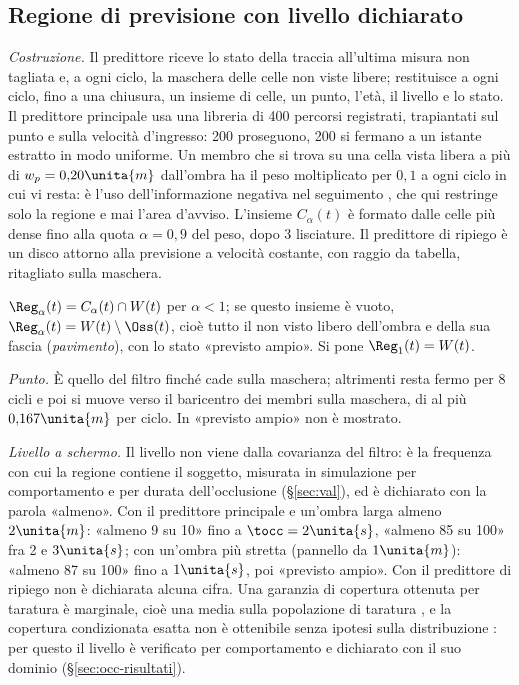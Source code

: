 \subsection{Regione di previsione con livello dichiarato}\label{sec:occ-regione}

\emph{Costruzione.} Il predittore riceve lo stato della traccia all'ultima misura non tagliata e, a ogni ciclo, la maschera delle celle non viste libere; restituisce a ogni ciclo, fino a una chiusura, un insieme di celle, un punto, l'età, il livello e lo stato. Il predittore principale usa una libreria di 400 percorsi registrati, trapiantati sul punto e sulla velocità d'ingresso: 200 proseguono, 200 si fermano a un istante estratto in modo uniforme. Un membro che si trova su una cella vista libera a più di $w_p=0{,}20\unita{m}$ dall'ombra ha il peso moltiplicato per $0{,}1$ a ogni ciclo in cui vi resta: è l'uso dell'informazione negativa nel seguimento \cite{koch2007,wyffels2015}, che qui restringe solo la regione e mai l'area d'avviso. L'insieme $C_\alpha(t)$ è formato dalle celle più dense fino alla quota $\alpha=0{,}9$ del peso, dopo 3 lisciature. Il predittore di ripiego è un disco attorno alla previsione a velocità costante, con raggio da tabella, ritagliato sulla maschera.

\begin{definizione}\label{def:occ-regione}
$\Reg_\alpha(t)=C_\alpha(t)\cap W(t)$ per $\alpha<1$; se questo insieme è vuoto, $\Reg_\alpha(t)=W(t)\setminus\Oss(t)$, cioè tutto il non visto libero dell'ombra e della sua fascia (\emph{pavimento}), con lo stato «previsto ampio». Si pone $\Reg_1(t)=W(t)$.
\end{definizione}

\emph{Punto.} È quello del filtro finché cade sulla maschera; altrimenti resta fermo per 8 cicli e poi si muove verso il baricentro dei membri sulla maschera, di al più $0{,}167\unita{m}$ per ciclo. In «previsto ampio» non è mostrato.

\emph{Livello a schermo.} Il livello non viene dalla covarianza del filtro: è la frequenza con cui la regione contiene il soggetto, misurata in simulazione per comportamento e per durata dell'occlusione (\S\ref{sec:val}), ed è dichiarato con la parola «almeno». Con il predittore principale e un'ombra larga almeno $2\unita{m}$: «almeno 9 su 10» fino a $\tocc=2\unita{s}$, «almeno 85 su 100» fra 2 e $3\unita{s}$; con un'ombra più stretta (pannello da $1\unita{m}$): «almeno 87 su 100» fino a $1\unita{s}$, poi «previsto ampio». Con il predittore di ripiego non è dichiarata alcuna cifra. Una garanzia di copertura ottenuta per taratura è marginale, cioè una media sulla popolazione di taratura \cite{angelopoulos2021}, e la copertura condizionata esatta non è ottenibile senza ipotesi sulla distribuzione \cite{barber2019}: per questo il livello è verificato per comportamento e dichiarato con il suo dominio (\S\ref{sec:occ-risultati}).

